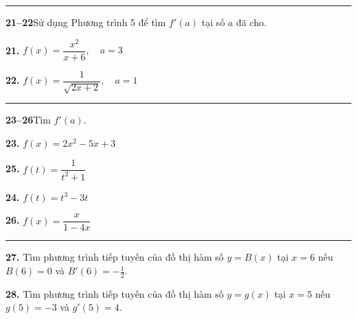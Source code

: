 \begin{minipage}[t]{0.48\textwidth}
  {\color{stewartcyan}\rule{\linewidth}{0.5pt}}
  \vspace{1.5mm}

  {\bfseries\color{stewartcyan} 21--22}\quad Sử dụng Phương trình 5 để tìm $f'(a)$ tại số $a$ đã cho.
  \vspace{1.5mm}

  \noindent
  \begin{minipage}[t]{0.48\linewidth}
    \textbf{21.} $f(x) = \dfrac{x^2}{x + 6}, \quad a = 3$
  \end{minipage}\hfill
  \begin{minipage}[t]{0.48\linewidth}
    \textbf{22.} $f(x) = \dfrac{1}{\sqrt{2x + 2}}, \quad a = 1$
  \end{minipage}
  \vspace{2mm}

  {\color{stewartcyan}\rule{\linewidth}{0.5pt}}
  \vspace{1.5mm}

  {\bfseries\color{stewartcyan} 23--26}\quad Tìm $f'(a)$.
  \vspace{1.5mm}

  \noindent
  \begin{minipage}[t]{0.48\linewidth}
    \textbf{23.} $f(x) = 2x^2 - 5x + 3$
    \vspace{2mm}

    \textbf{25.} $f(t) = \dfrac{1}{t^2 + 1}$
  \end{minipage}\hfill
  \begin{minipage}[t]{0.48\linewidth}
    \textbf{24.} $f(t) = t^3 - 3t$
    \vspace{2mm}

    \textbf{26.} $f(x) = \dfrac{x}{1 - 4x}$
  \end{minipage}
  \vspace{2.5mm}

  {\color{stewartcyan}\rule{\linewidth}{0.5pt}}
  \vspace{1.5mm}

  \textbf{27.} Tìm phương trình tiếp tuyến của đồ thị hàm số $y = B(x)$ tại $x = 6$ nếu $B(6) = 0$ và $B'(6) = -\frac{1}{2}$.
  \vspace{2mm}

  \textbf{28.} Tìm phương trình tiếp tuyến của đồ thị hàm số $y = g(x)$ tại $x = 5$ nếu $g(5) = -3$ và $g'(5) = 4$.
\end{minipage}%
\hfill
